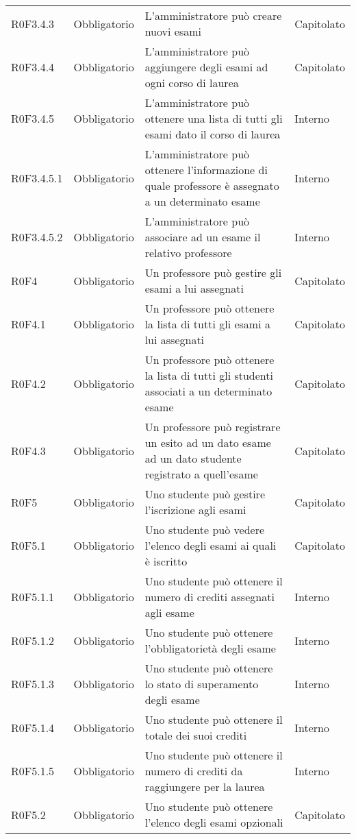 \documentclass[AnalisiDeiRequisiti.tex]{subfiles}
\begin{document}
\begin{longtable}[H]{p{2.6cm}p{2.5cm}p{5cm}p{2cm}}
	R0F3.4.3 & Obbligatorio & L'amministratore può creare nuovi esami & Capitolato \\  
	R0F3.4.4 & Obbligatorio & L'amministratore può aggiungere degli esami ad ogni corso di laurea & Capitolato \\  
	R0F3.4.5 & Obbligatorio & L'amministratore può ottenere una lista di tutti gli esami dato il corso di laurea & Interno \\  
	R0F3.4.5.1 & Obbligatorio & L'amministratore può ottenere l'informazione di quale professore è assegnato a un determinato esame & Interno \\  
	R0F3.4.5.2  & Obbligatorio & L'amministratore può associare ad un esame il relativo professore & Interno \\  
	R0F4 & Obbligatorio & Un professore può gestire gli esami a lui assegnati & Capitolato \\  
	R0F4.1 & Obbligatorio & Un professore può ottenere la lista di tutti gli esami a lui assegnati & Capitolato \\  
	R0F4.2 & Obbligatorio & Un professore può ottenere la lista di tutti gli studenti associati a un determinato esame & Capitolato \\  
	R0F4.3 & Obbligatorio & Un professore può registrare un esito ad un dato esame ad un dato studente registrato a quell'esame & Capitolato \\  
	R0F5 & Obbligatorio & Uno studente può gestire l'iscrizione agli esami & Capitolato \\  
	R0F5.1 & Obbligatorio & Uno studente può vedere l'elenco degli esami ai quali è iscritto & Capitolato \\  
	R0F5.1.1 & Obbligatorio & Uno studente può ottenere il numero di crediti assegnati agli esame & Interno \\  
	R0F5.1.2 & Obbligatorio & Uno studente può ottenere l'obbligatorietà degli esame & Interno \\  
	R0F5.1.3 & Obbligatorio & Uno studente può ottenere lo stato di superamento degli esame & Interno \\  
	R0F5.1.4 & Obbligatorio & Uno studente può ottenere il totale dei suoi crediti & Interno \\  
	R0F5.1.5 & Obbligatorio & Uno studente può ottenere il numero di crediti da raggiungere per la laurea & Interno \\  
	R0F5.2 & Obbligatorio & Uno studente può ottenere l'elenco degli esami opzionali & Capitolato \\  

\end{longtable}
\end{document}

